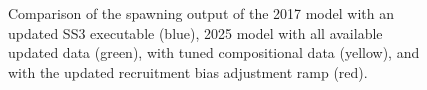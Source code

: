 \documentclass[
]{scrartcl}
\begin{document}
\begin{figure}


\caption{\label{fig-newdata_5}Comparison of the spawning output of the
2017 model with an updated SS3 executable (blue), 2025 model with all
available updated data (green), with tuned compositional data (yellow),
and with the updated recruitment bias adjustment ramp (red).}

\end{figure}%
\end{document}

